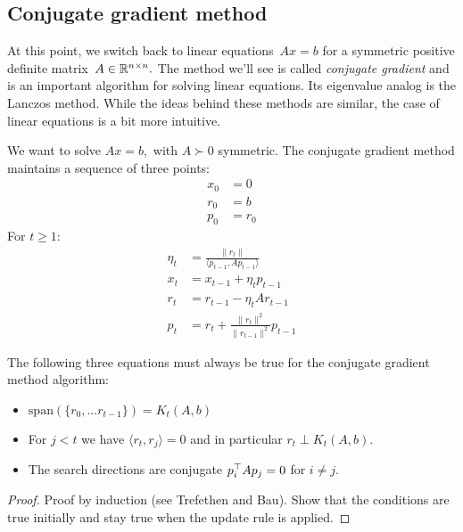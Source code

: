 \subsection{Conjugate gradient method}
At this point, we switch back to linear equations~$Ax=b$ for a symmetric
positive definite matrix~$A\in\mathbb{R}^{n\times n}.$ The method we'll see is called
\emph{conjugate gradient} and is an important algorithm for solving linear
equations. Its eigenvalue analog is the Lanczos method. While the ideas behind
these methods are similar, the case of linear equations is a bit more intuitive.
%
\begin{definition}
We want to solve $Ax = b,$ with  $A\succ 0$ symmetric. The conjugate gradient
method maintains a sequence of three points:
\begin{align*}
x_0 &= 0 \tag{ ``candidate solution''} \\
r_0 &= b \tag{ ``residual''} \\
p_0 &= r_0 \tag{ ``search direction''}
\end{align*}
For $t \ge 1:$
\begin{align*}
\eta_t &= \frac{\|r_t\|}{\langle p_{t-1}, Ap_{t-1}\rangle} \tag{``step size''} \\
x_t &= x_{t-1} + \eta_t p_{t-1} \\
r_t &= r_{t-1} - \eta_t A r_{t-1} \\
p_t &= r_t + \frac{\|r_t\|^2}{\|r_{t-1}\|^2}p_{t-1}
\end{align*}
\end{definition}

\begin{lemma}
The following three equations must always be true for the conjugate gradient
method algorithm:
\begin{itemize}
\item $\mathrm{span}(\{r_0, ...r_{t-1}\}) = K_t(A,b)$
\item For $j<t$ we have $\langle r_t, r_j\rangle = 0$ and in particular
$r_t \perp K_t(A,b).$
\item The search directions are conjugate $p_i^{\top} A p_j = 0$ for $i\ne j.$
\end{itemize}
\end{lemma}
\begin{proof}
Proof by induction (see Trefethen and Bau). Show that the conditions are true
initially and stay true when the update rule is applied.  
\end{proof}

